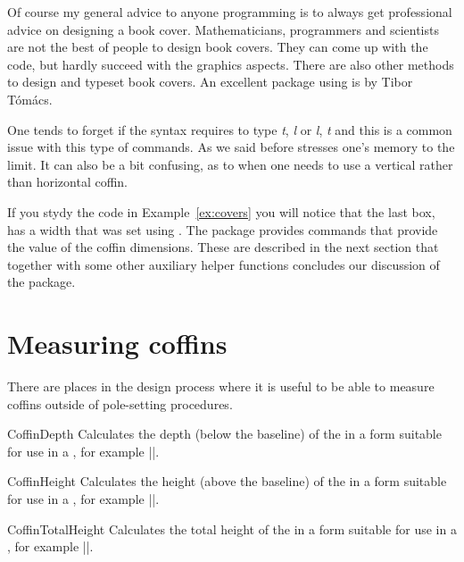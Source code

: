 Of course my general advice to anyone programming \latex is to always get professional advice on designing a book cover. Mathematicians, programmers and scientists are not the best of people to design book covers. They can come up with the code, but hardly succeed with the graphics aspects. There are also other methods to design and typeset book covers. An excellent package using \tikzname is  by Tibor Tómács. 


One tends to forget if the syntax requires to type \textit{t}, \textit{l} or \textit{l}, \textit{t} and this is a common issue with this type of commands. As we said before \latex stresses one’s memory to the limit. It can also be a bit confusing, as to when one needs to use a vertical rather than horizontal coffin.
    
If you stydy the code in Example~\ref{ex:covers} you will notice that the last box, has a width that was set using
. The package provides commands that provide the value of the coffin dimensions. These are described in the next section that together with some other auxiliary helper functions concludes our discussion of the package.

 \section{Measuring coffins}

 There are places in the design process where it is useful to be able to
 measure coffins outside of pole-setting procedures.

 \begin{docCommand}{CoffinDepth}{  }
   Calculates the depth (below the baseline) of the 
   in a form suitable for use in a , for example
   |\setlength{\mylength}{\CoffinDepth\ExampleCoffin}|.
 \end{docCommand}

 \begin{docCommand}{CoffinHeight}{ }
   Calculates the height (above the baseline) of the 
   in a form suitable for use in a , for example
   |\setlength{\mylength}{\CoffinHeight\ExampleCoffin}|.
 \end{docCommand}

 \begin{docCommand}{CoffinTotalHeight}{ }
   Calculates the total height of the 
   in a form suitable for use in a , for example
   |\setlength{\mylength}{\CoffinTotalHeight\ExampleCoffin}|.
 \end{docCommand}


